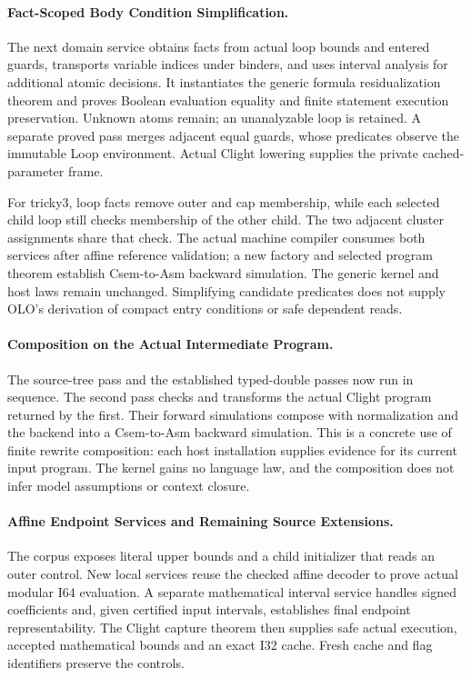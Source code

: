 \paragraph{Fact-Scoped Body Condition Simplification.}
The next domain service obtains facts from actual loop bounds and entered
guards, transports variable indices under binders, and uses interval analysis
for additional atomic decisions. It instantiates the generic formula
residualization theorem and proves Boolean evaluation equality and finite
statement execution preservation. Unknown atoms remain; an unanalyzable loop
is retained. A separate proved pass merges adjacent equal guards, whose
predicates observe the immutable Loop environment. Actual Clight lowering
supplies the private cached-parameter frame.

For tricky3, loop facts remove outer and cap membership, while each selected
child loop still checks membership of the other child. The two adjacent
cluster assignments share that check. The actual machine compiler consumes
both services after affine reference validation; a new factory and selected
program theorem establish Csem-to-Asm backward simulation. The generic kernel
and host laws remain unchanged. Simplifying candidate predicates does not
supply OLO's derivation of compact entry conditions or safe dependent reads.

\paragraph{Composition on the Actual Intermediate Program.}
The source-tree pass and the established typed-double passes now run in
sequence. The second pass checks and transforms the actual Clight program
returned by the first. Their forward simulations compose with normalization
and the backend into a Csem-to-Asm backward simulation. This is a concrete
use of finite rewrite composition: each host installation supplies evidence
for its current input program. The kernel gains no language law, and the
composition does not infer model assumptions or context closure.

\paragraph{Affine Endpoint Services and Remaining Source Extensions.}
The corpus exposes literal upper bounds and a child initializer that reads an
outer control. New local services reuse the checked affine decoder to prove
actual modular I64 evaluation. A separate mathematical interval service handles
signed coefficients and, given certified input intervals, establishes final
endpoint representability. The Clight capture theorem then supplies safe actual
execution, accepted mathematical bounds and an exact I32 cache. Fresh cache and
flag identifiers preserve the controls.

